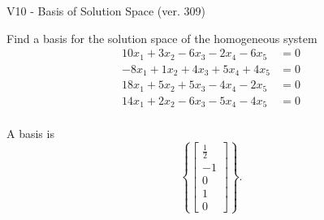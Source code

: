 \begin{exercise}
  \begin{exerciseTitle}V10 - Basis of Solution Space (ver. 309)\end{exerciseTitle}
  \begin{exerciseStatement}
    Find a basis for the solution space of the homogeneous system 
\begin{align*}
 10 x_ 1 + 3 x_ 2 -6 x_ 3 -2 x_ 4 -6 x_ 5 &= 0  \\ 
  -8 x_ 1 + 1 x_ 2 + 4 x_ 3 + 5 x_ 4 + 4 x_ 5 &= 0  \\ 
  18 x_ 1 + 5 x_ 2 + 5 x_ 3 -4 x_ 4 -2 x_ 5 &= 0  \\ 
  14 x_ 1 + 2 x_ 2 -6 x_ 3 -5 x_ 4 -4 x_ 5 &= 0  \\ 
 \end{align*}


 
  \end{exerciseStatement}

  \begin{exerciseAnswer}
   A basis is   
\[\left\{\left[\begin{array}{c}
\frac{1}{2} \\
-1 \\
0 \\
1 \\
0
\end{array}\right]\right\}.\]

  


  \end{exerciseAnswer}
\end{exercise}